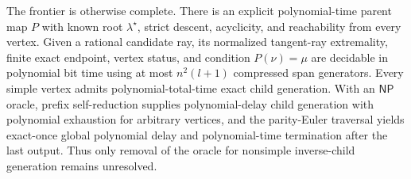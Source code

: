 The frontier is otherwise complete. There is an explicit polynomial-time parent map \(P\) with known root \(\lambda^\star\), strict descent, acyclicity, and reachability from every vertex. Given a rational candidate ray, its normalized tangent-ray extremality, finite exact endpoint, vertex status, and condition \(P(\nu)=\mu\) are decidable in polynomial bit time using at most \(n^2(l+1)\) compressed span generators. Every simple vertex admits polynomial-total-time exact child generation. With an \(\mathsf{NP}\) oracle, prefix self-reduction supplies polynomial-delay child generation with polynomial exhaustion for arbitrary vertices, and the parity-Euler traversal yields exact-once global polynomial delay and polynomial-time termination after the last output. Thus only removal of the oracle for nonsimple inverse-child generation remains unresolved.